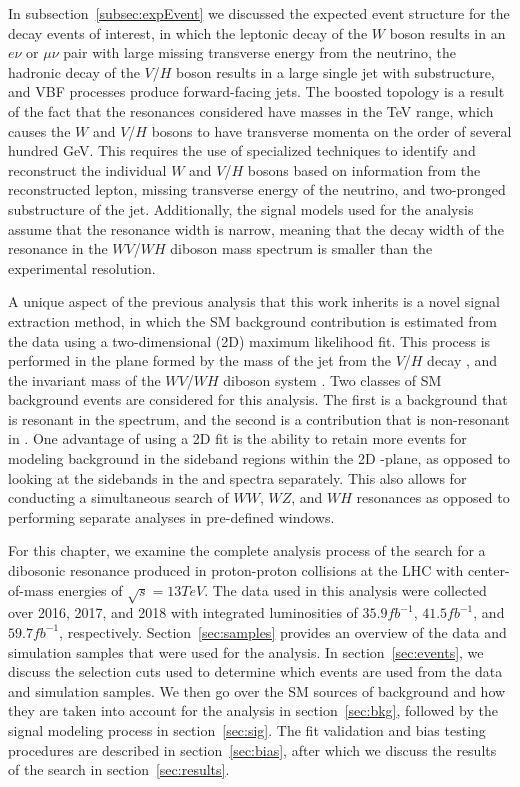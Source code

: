 In subsection~\ref{subsec:expEvent} we discussed the expected event structure for the decay events of interest, in which the leptonic decay of the $W$ boson results in an $e\nu$ or $\mu\nu$ pair with large missing transverse energy from the neutrino, the hadronic decay of the $V$/$H$ boson results in a large single jet with substructure, and VBF processes produce forward-facing jets.
The boosted topology is a result of the fact that the resonances considered have masses in the TeV range, which causes the $W$ and $V$/$H$ bosons to have transverse momenta on the order of several hundred GeV.
This requires the use of specialized techniques to identify and reconstruct the individual $W$ and $V$/$H$ bosons based on information from the reconstructed lepton, missing transverse energy of the neutrino, and two-pronged substructure of the jet.
Additionally, the signal models used for the analysis assume that the resonance width is narrow, meaning that the decay width of the resonance in the $WV$/$WH$ diboson mass spectrum is smaller than the experimental resolution.

A unique aspect of the previous analysis that this work inherits is a novel signal extraction method, in which the SM background contribution is estimated from the data using a two-dimensional (2D) maximum likelihood fit.
This process is performed in the plane formed by the mass of the jet from the $V$/$H$ decay \MJ, and the invariant mass of the $WV$/$WH$ diboson system \MVV.
Two classes of SM background events are considered for this analysis.
The first is a \WVt background that is resonant in the \MJ spectrum, and the second is a \Wjets contribution that is non-resonant in \MJ.
One advantage of using a 2D fit is the ability to retain more events for modeling background in the sideband regions within the 2D \MJ-\MVV plane, as opposed to looking at the sidebands in the \MJ and \MVV spectra separately.
This also allows for conducting a simultaneous search of $WW$, $WZ$, and $WH$ resonances as opposed to performing separate analyses in pre-defined \MJ windows.

For this chapter, we examine the complete analysis process of the search for a dibosonic resonance produced in proton-proton collisions at the LHC with center-of-mass energies of $\sqrt{s}=13\unit{TeV}$.
The data used in this analysis were collected over 2016, 2017, and 2018 with integrated luminosities of $35.9\unit{fb^{-1}}$, $41.5\unit{fb^{-1}}$, and $59.7\unit{fb^{-1}}$, respectively.
Section~\ref{sec:samples} provides an overview of the data and simulation samples that were used for the analysis.
In section~\ref{sec:events}, we discuss the selection cuts used to determine which events are used from the data and simulation samples.
We then go over the SM sources of background and how they are taken into account for the analysis in section~\ref{sec:bkg}, followed by the signal modeling process in section~\ref{sec:sig}.
The fit validation and bias testing procedures are described in section~\ref{sec:bias}, after which we discuss the results of the search in section~\ref{sec:results}.

